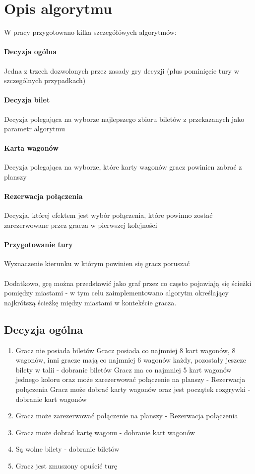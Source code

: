 \documentclass[12pt, oneside]{report}
\begin{document}
\section{Opis algorytmu}
W pracy przygotowano kilka szczegółówych algorytmów:
\paragraph{Decyzja ogólna} Jedna z trzech dozwolonych przez zasady gry decyzji (plus pominięcie tury w szczególnych przypadkach)
\paragraph{Decyzja bilet} Decyzja polegająca na wyborze najlepszego zbioru biletów z przekazanych jako parametr algorytmu
\paragraph{Karta wagonów} Decyzja polegająca na wyborze, które karty wagonów gracz powinien zabrać z planszy
\paragraph{Rezerwacja połączenia} Decyzja, której efektem jest wybór połączenia, które powinno zostać zarezerwowane przez gracza w pierwszej kolejności
\paragraph{Przygotowanie tury} Wyznaczenie kierunku w którym powinien się gracz poruszać
\\ \\
Dodatkowo, grę można przedstawić jako graf przez co często pojawiają się ścieżki pomiędzy miastami - w tym celu zaimplementowano algorytm określający najkrótszą ścieżkę między miastami w kontekście gracza.
\subsection{Decyzja ogólna}
\begin{enumerate}
	\item Gracz nie posiada biletów
	 Gracz posiada co najmniej 8 kart wagonów, 8 wagonów, inni gracze mają co najmniej 6 wagonów każdy, pozostały jeszcze bilety w talii - dobranie biletów
	 Gracz ma co najmniej 5 kart wagonów jednego koloru oraz może zarezerwować połączenie na planszy - Rezerwacja połączenia
	 Gracz może dobrać karty wagonów oraz jest początek rozgrywki - dobranie kart wagonów
	\item Gracz może zarezerwować połączenie na planszy - Rezerwacja połączenia
	\item Gracz może dobrać kartę wagonu - dobranie kart wagonów
	\item Są wolne bilety - dobranie biletów
	\item Gracz jest zmuszony opuścić turę
\end{enumerate}
\end{document}
